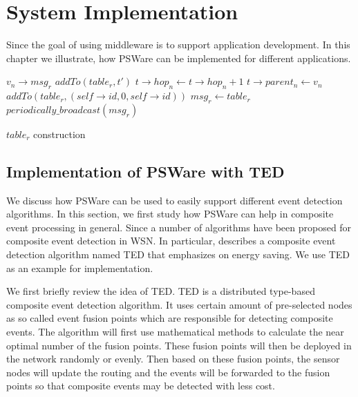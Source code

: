 \chapter{System Implementation}
\label{chapter:implementation}
Since the goal of using middleware is to support application development. In this chapter we illustrate, how PSWare can be implemented for different applications.

\begin{algorithm}
\begin{algorithmic}[1]
\REQUIRE \(v_n\rightarrow msg_r\)
			\STATE \(addTo(table_r, t')\)
		\ENDIF
					\STATE \(t\rightarrow hop_n \gets t\rightarrow hop_n+1\)
					\STATE \(t\rightarrow parent_n \gets v_n\)
				\ENDIF
			\ENDIF
		\ENDFOR
	\ENDFOR
		\STATE \(addTo(table_r, (self\rightarrow id, 0, self\rightarrow id))\)
	\ENDIF
	\STATE \(msg_r \gets table_r\)
	\STATE \(periodically\_broadcast(msg_r)\)
\end{algorithmic}
\caption{\(table_r\) construction}
\label{algo:table_r}
\end{algorithm}

\section{Implementation of PSWare with TED}
We discuss how PSWare can be used to easily support different event detection algorithms. In this section, we first study how PSWare can help in composite event processing in general. Since a number of algorithms have been proposed for composite event detection in WSN. In particular, \cite{lai:ted} describes a composite event detection algorithm named TED that emphasizes on energy saving. We use TED as an example for implementation.

We first briefly review the idea of TED. TED is a distributed type-based composite event detection algorithm. It uses certain amount of pre-selected nodes as so called event fusion points which are responsible for detecting composite events. The algorithm will first use mathematical methods to calculate the near optimal number of the fusion points. These fusion points will then be deployed in the network randomly or evenly. Then based on these fusion points, the sensor nodes will update the routing and the events will be forwarded to the fusion points so that composite events may be detected with less cost.

